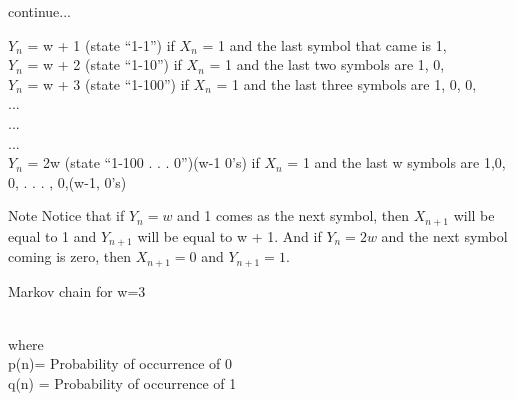 \documentclass{beamer}
\begin{document}
\begin{frame}
   \begin{block}{continue...}
   
   \(Y_n\) = w + 1 (state “1-1”) if \(X_n\) = 1 and the last symbol that came is 1,\\
   \(Y_n\) = w + 2 (state “1-10”) if \(X_n\) = 1 and the last two symbols are 1, 0, \\
   \(Y_n\) = w + 3 (state “1-100”) if \(X_n\) = 1 and the last three symbols are 1, 0, 0, \\
   ...\\
   ...\\
   ...\\
   \(Y_n\) = 2w (state “1-100 . . . 0”)(w-1 0's) if \(X_n\) = 1 and the last w symbols are 1,0, 0, . . . , 0,(w-1, 0's)
   
   \end{block}
   \begin{alertblock}{Note}
    Notice that if \(Y_n = w\) and 1 comes as the next symbol, then \(X_{n+1}\) will be equal
    to 1 and \(Y_{n+1}\) will be equal to w + 1. And if \(Y_{n} = 2w\) and the next symbol
    coming is zero, then \(X_{n+1} = 0\) and \(Y_{n+1} = 1\).
   \end{alertblock}
    
\end{frame}
\begin{frame}
   \begin{block}{Markov chain for w=3}
   \begin{center}
   \end{center}
    \\
    where \\
   p(n)= Probability of occurrence of 0 \\
   q(n) = Probability of occurrence of 1
   \end{block}
\end{frame}
\end{document}
